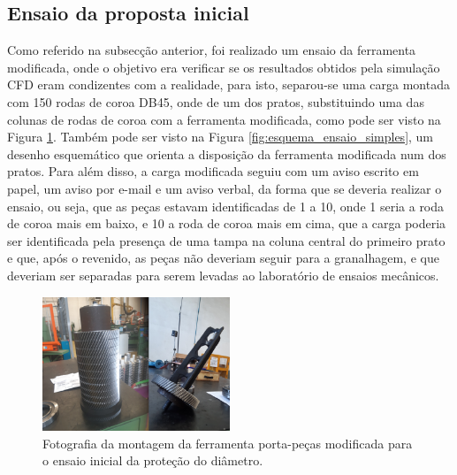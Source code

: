 \subsection{Ensaio da proposta inicial} \label{ssec:materiais_ensaio_simples}
Como referido na subsecção anterior, foi realizado um ensaio da ferramenta modificada, onde o objetivo era verificar se os resultados obtidos pela simulação CFD eram condizentes com a realidade, para isto, separou-se uma carga montada com 150 rodas de coroa DB45, onde de um dos pratos, substituindo uma das colunas de rodas de coroa com a ferramenta modificada, como pode ser visto na Figura \ref{fig:ensaio_simples}. Também pode ser visto na Figura \ref{fig:esquema_ensaio_simples}, um desenho esquemático que orienta a disposição da ferramenta modificada num dos pratos. Para além disso, a carga modificada seguiu com um aviso escrito em papel, um aviso por e-mail e um aviso verbal, da forma que se deveria realizar o ensaio, ou seja, que as peças estavam identificadas de 1 a 10, onde 1 seria a roda de coroa mais em baixo, e 10 a roda de coroa mais em cima, que a carga poderia ser identificada pela presença de uma tampa na coluna central do primeiro prato e que, após o revenido, as peças não deveriam seguir para a granalhagem, e que deveriam ser separadas para serem levadas ao laboratório de ensaios mecânicos.
\begin{figure}[htb]
    \centering
    \includegraphics[width = 0.5\textwidth]{Figures/Cap3/Ensaio_simples.png}
    \caption[Montagem do ensaio do protótipo inicial da ferramenta modificada]%
    {Fotografia da montagem da ferramenta porta-peças modificada para o ensaio inicial da proteção do diâmetro.}
    \label{fig:ensaio_simples}
\end{figure}
